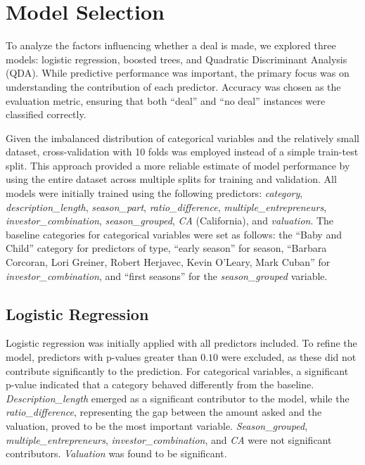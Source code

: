 \documentclass{article}
\begin{document}
\section{Model Selection}

To analyze the factors influencing whether a deal is made, we explored three models: logistic regression, boosted trees, and Quadratic Discriminant Analysis (QDA). While predictive performance was important, the primary focus was on understanding the contribution of each predictor. Accuracy was chosen as the evaluation metric, ensuring that both ``deal'' and ``no deal'' instances were classified correctly.

Given the imbalanced distribution of categorical variables and the relatively small dataset, cross-validation with 10 folds was employed instead of a simple train-test split. This approach provided a more reliable estimate of model performance by using the entire dataset across multiple splits for training and validation. All models were initially trained using the following predictors: \textit{category}, \textit{description\_length}, \textit{season\_part}, \textit{ratio\_difference}, \textit{multiple\_entrepreneurs}, \textit{investor\_combination}, \textit{season\_grouped}, \textit{CA} (California), and \textit{valuation}. The baseline categories for categorical variables were set as follows: the ``Baby and Child'' category for predictors of type, ``early season'' for season, ``Barbara Corcoran, Lori Greiner, Robert Herjavec, Kevin O'Leary, Mark Cuban'' for \textit{investor\_combination}, and ``first seasons'' for the \textit{season\_grouped} variable.

\subsection{Logistic Regression}

Logistic regression was initially applied with all predictors included. To refine the model, predictors with p-values greater than $0.10$ were excluded, as these did not contribute significantly to the prediction. For categorical variables, a significant p-value indicated that a category behaved differently from the baseline. \textit{Description\_length} emerged as a significant contributor to the model, while the \textit{ratio\_difference}, representing the gap between the amount asked and the valuation, proved to be the most important variable. \textit{Season\_grouped}, \textit{multiple\_entrepreneurs}, \textit{investor\_combination}, and \textit{CA} were not significant contributors. \textit{Valuation} was found to be significant.
\end{document}
